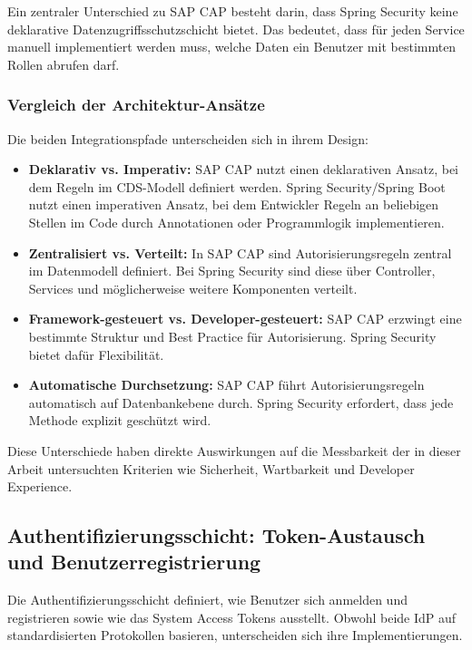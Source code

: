 Ein zentraler Unterschied zu \ac{SAP CAP} besteht darin, dass Spring Security keine deklarative Datenzugriffsschutzschicht bietet. Das bedeutet, dass für jeden Service manuell implementiert werden muss, welche Daten ein Benutzer mit bestimmten Rollen abrufen darf.

\subsubsection{Vergleich der Architektur-Ansätze}

Die beiden Integrationspfade unterscheiden sich in ihrem Design:

\begin{itemize}
    \item \textbf{Deklarativ vs. Imperativ:} \ac{SAP CAP} nutzt einen deklarativen Ansatz, bei dem Regeln im \ac{CDS}-Modell definiert werden. Spring Security/Spring Boot nutzt einen imperativen Ansatz, bei dem Entwickler Regeln an beliebigen Stellen im Code durch Annotationen oder Programmlogik implementieren.

    \item \textbf{Zentralisiert vs. Verteilt:} In \ac{SAP CAP} sind Autorisierungsregeln zentral im Datenmodell definiert. Bei Spring Security sind diese über Controller, Services und möglicherweise weitere Komponenten verteilt.

    \item \textbf{Framework-gesteuert vs. Developer-gesteuert:} \ac{SAP CAP} erzwingt eine bestimmte Struktur und Best Practice für Autorisierung. Spring Security bietet dafür Flexibilität.

    \item \textbf{Automatische Durchsetzung:} \ac{SAP CAP} führt Autorisierungsregeln automatisch auf Datenbankebene durch. Spring Security erfordert, dass jede Methode explizit geschützt wird.
\end{itemize}

Diese Unterschiede haben direkte Auswirkungen auf die Messbarkeit der in dieser Arbeit untersuchten Kriterien wie Sicherheit, Wartbarkeit und Developer Experience.


\subsection{Authentifizierungsschicht: Token-Austausch und Benutzerregistrierung}

Die Authentifizierungsschicht definiert, wie Benutzer sich anmelden und registrieren sowie wie das System Access Tokens ausstellt. Obwohl beide \ac{IdP} auf standardisierten Protokollen basieren, unterscheiden sich ihre Implementierungen.

